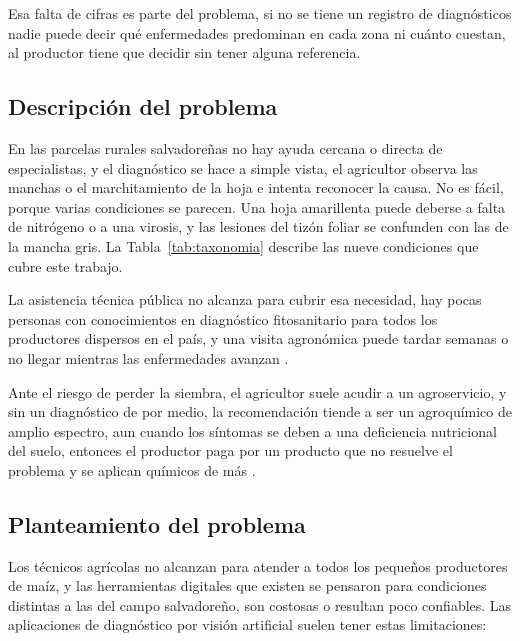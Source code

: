 Esa falta de cifras es parte del problema, si no se tiene un registro de diagn\'osticos nadie puede decir qu\'e enfermedades predominan en cada zona ni cu\'anto cuestan, al productor tiene que decidir sin tener alguna referencia.

\subsection{Descripci\'on del problema}

En las parcelas rurales salvadore\~nas no hay ayuda cercana o directa de especialistas, y el diagn\'ostico se hace a simple vista, el agricultor observa las manchas o el marchitamiento de la hoja e intenta reconocer la causa. No es f\'acil, porque varias condiciones se parecen. Una hoja amarillenta puede deberse a falta de nitr\'ogeno o a una virosis, y las lesiones del tiz\'on foliar se confunden con las de la mancha gris. La Tabla~\ref{tab:taxonomia} describe las nueve condiciones que cubre este trabajo.

La asistencia t\'ecnica p\'ublica no alcanza para cubrir esa necesidad, hay pocas personas con conocimientos en diagn\'ostico fitosanitario para todos los productores dispersos en el pa\'is, y una visita agron\'omica puede tardar semanas o no llegar mientras las enfermedades avanzan \cite{centa2022}.

Ante el riesgo de perder la siembra, el agricultor suele acudir a un agroservicio, y sin un diagn\'ostico de por medio, la recomendaci\'on tiende a ser un agroqu\'imico de amplio espectro, aun cuando los s\'intomas se deben a una deficiencia nutricional del suelo, entonces el productor paga por un producto que no resuelve el problema y se aplican qu\'imicos de m\'as \cite{centa2022}.

\subsection{Planteamiento del problema}

Los t\'ecnicos agr\'icolas no alcanzan para atender a todos los peque\~nos productores de ma\'iz, y las herramientas digitales que existen se pensaron para condiciones distintas a las del campo salvadore\~no, son costosas o resultan poco confiables. Las aplicaciones de diagn\'ostico por visi\'on artificial suelen tener estas limitaciones:

